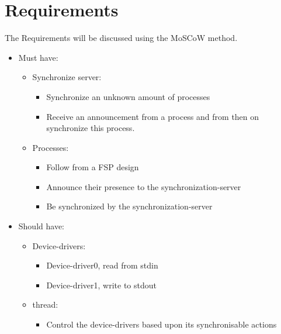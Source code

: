 \hypertarget{requirements}{%
\section{Requirements}\label{requirements}}

The Requirements will be discussed using the MoSCoW method.

\begin{itemize}
\tightlist
\item
  Must have:

  \begin{itemize}
  \tightlist
  \item
    Synchronize server:

    \begin{itemize}
    \tightlist
    \item
      Synchronize an unknown amount of processes
    \item
      Receive an announcement from a process and from then on
      synchronize this process.
    \end{itemize}
  \item
    Processes:

    \begin{itemize}
    \tightlist
    \item
      Follow from a FSP design
    \item
      Announce their presence to the synchronization-server
    \item
      Be synchronized by the synchronization-server
    \end{itemize}
  \end{itemize}
\item
  Should have:

  \begin{itemize}
  \tightlist
  \item
    Device-drivers:

    \begin{itemize}
    \tightlist
    \item
      Device-driver0, read from stdin
    \item
      Device-driver1, write to stdout
    \end{itemize}
  \item
    thread:

    \begin{itemize}
    \tightlist
    \item
      Control the device-drivers based upon its synchronisable actions
    \end{itemize}
  \end{itemize}
\end{itemize}
